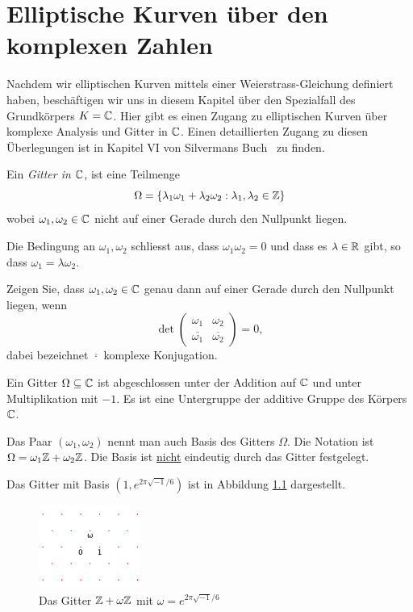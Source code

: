 \chapter{Elliptische Kurven über den komplexen Zahlen}

Nachdem wir elliptischen Kurven mittels einer Weierstrass-Gleichung
definiert haben, beschäftigen wir uns in diesem Kapitel über den
Spezialfall des Grundkörpers $K={\mathbb{C}}$. Hier gibt es einen Zugang zu
elliptischen Kurven über komplexe Analysis und Gitter in ${\mathbb{C}}$. Einen
detaillierten Zugang zu diesen Überlegungen ist in Kapitel VI von
Silvermans Buch~\cite{Silverman:AEC} zu finden. 

\begin{definition}
  Ein \emph{Gitter in ${\mathbb{C}}$}, ist eine
  Teilmenge
  $$\Omega = \{\lambda_1 \omega_1 + \lambda_2 \omega_2 :
  \lambda_1,\lambda_2\in{\mathbb{Z}}\}$$
  wobei $\omega_1,\omega_2\in{\mathbb{C}}$ nicht auf einer Gerade
  durch den Nullpunkt liegen. 
\end{definition}

Die Bedingung an $\omega_1,\omega_2$ schliesst aus, dass
$\omega_1\omega_2=0$ und dass es $\lambda\in{\mathbb{R}}$ gibt, so dass
$\omega_1 = \lambda\omega_2$.

\begin{aufgabe}
  Zeigen Sie, dass $\omega_1,\omega_2\in{\mathbb{C}}$ genau dann auf einer
  Gerade durch den Nullpunkt liegen, wenn
  \begin{equation*}
    \det \left(
      \begin{array}{ll}
        \omega_1 & \omega_2 \\
        \overline{\omega_1} & \overline{\omega_2}
      \end{array}
    \right)=0,
  \end{equation*}
  dabei bezeichnet $\overline{\cdot}$ komplexe Konjugation. 
\end{aufgabe}

Ein Gitter $\Omega\subseteq{\mathbb{C}}$ ist abgeschlossen unter der Addition auf
${\mathbb{C}}$ und unter Multiplikation mit $-1$. Es ist eine Untergruppe der
additive Gruppe des Körpers ${\mathbb{C}}$.

Das Paar $(\omega_1,\omega_2)$ nennt man auch Basis des Gitters
$\Omega$. Die Notation ist $\Omega = \omega_1{\mathbb{Z}} +\omega_2{\mathbb{Z}}$.
Die Basis ist \underline{nicht} eindeutig durch das Gitter festgelegt.


\begin{beispiel}
  Das Gitter mit Basis $(1,e^{2\pi
    \sqrt{-1}/6})$
  ist in Abbildung
  \ref{fig:lattice} dargestellt. 
  \begin{figure}
    \centering    
    \caption{Das Gitter ${\mathbb{Z}}+\omega{\mathbb{Z}}$ mit $\omega = e^{2\pi\sqrt{-1}/6}$}
    \label{fig:lattice}
    \includegraphics[width=0.3\textwidth]{./plots/lattice.png}
  \end{figure}
\end{beispiel}

